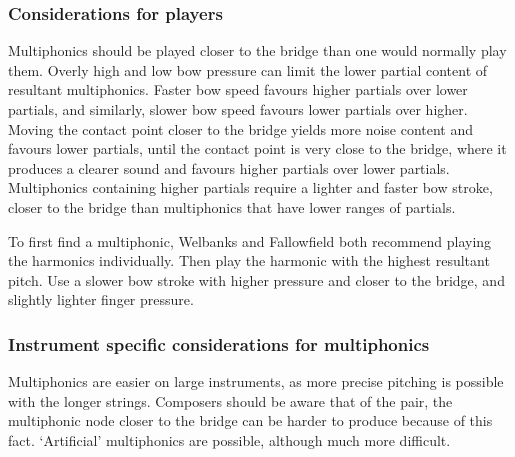 \subsubsection{Considerations for players}
Multiphonics should be played closer to the bridge than one would normally play them.
Overly high and low bow pressure can limit the lower partial content of resultant multiphonics.
Faster bow speed favours higher partials over lower partials, and similarly, slower bow speed favours lower partials over higher.
Moving the contact point closer to the bridge yields more noise content and favours lower partials, until the contact point is very close to the bridge, where it produces a clearer sound and favours higher partials over lower partials.\autocite[http://www.cellomap.com/index/the-string/multiphonics-and-other-multiple-sounds.html]{fallowfieldCelloMap}
Multiphonics containing higher partials require a lighter and faster bow stroke, closer to the bridge than multiphonics that have lower ranges of partials.\autocite[165]{welbanksFoundationsModernCello}

To first find a multiphonic, Welbanks and Fallowfield both recommend playing the harmonics individually.\autocite[167]{welbanksFoundationsModernCello}
Then play the harmonic with the highest resultant pitch. 
Use a slower bow stroke with higher pressure and closer to the bridge, and slightly lighter finger pressure.


\subsubsection{Instrument specific considerations for multiphonics}
Multiphonics are easier on large instruments, as more precise pitching is possible with the longer strings.
Composers should be aware that of the pair, the multiphonic node closer to the bridge can be harder to produce because of this fact.
`Artificial' multiphonics are possible, although much more difficult.\autocite[772]{guettlerBowedstringMultiphonicsAnalyzed2012}

